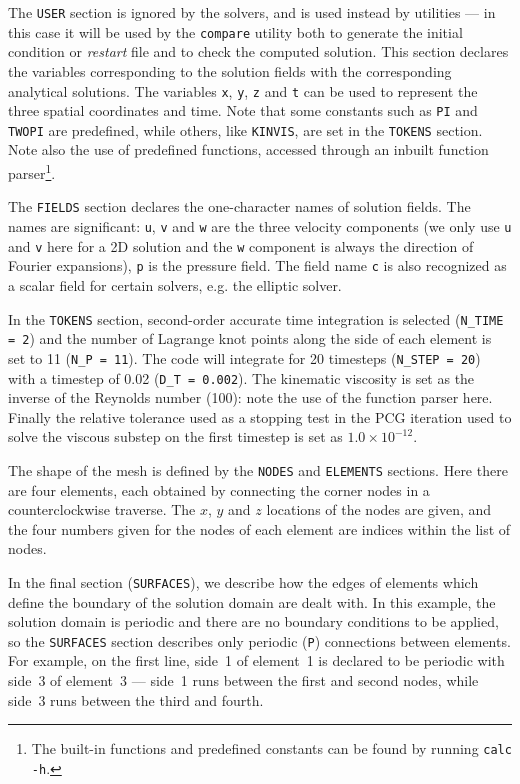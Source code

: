 \documentclass[11pt,a4paper]{report}
\begin{document}
The \texttt{USER} section is ignored by the solvers, and is used
instead by utilities --- in this case it will be used by the
\texttt{compare} utility both to generate the initial condition or
\emph{restart} file and to check the computed solution.  This
section declares the variables corresponding to the solution fields
with the corresponding analytical solutions.  The variables
\texttt{x}, \texttt{y}, \texttt{z} and \texttt{t} can be used to
represent the three spatial coordinates and time.  Note that some
constants such as \texttt{PI} and \texttt{TWOPI} are predefined, while
others, like \texttt{KINVIS}, are set in the \texttt{TOKENS} section.
Note also the use of predefined functions, accessed through an inbuilt
function parser\footnote{The built-in functions and predefined constants
can be found by running \texttt{calc -h}.}.

The \texttt{FIELDS} section declares the one-character names of
solution fields.  The names are significant: \texttt{u}, \texttt{v}
and \texttt{w} are the three velocity components (we only use
\texttt{u} and \texttt{v} here for a 2D solution and the \texttt{w}
component is always the direction of Fourier expansions), \texttt{p}
is the pressure field.  The field name \texttt{c} is also recognized
as a scalar field for certain solvers, e.g. the elliptic solver.

In the \texttt{TOKENS} section, second-order accurate time integration
is selected (\verb+N_TIME = 2+) and the number of Lagrange knot points
along the side of each element is set to 11 (\verb+N_P = 11+).  The
code will integrate for 20 timesteps (\verb+N_STEP = 20+) with a
timestep of 0.02 (\verb+D_T = 0.002+).  The kinematic viscosity is
set as the inverse of the Reynolds number (100): note the use of the
function parser here.  Finally the relative tolerance used as a
stopping test in the PCG iteration used to solve the viscous substep
on the first timestep is set as $1.0\times10^{-12}$.

The shape of the mesh is defined by the \texttt{NODES} and
\texttt{ELEMENTS} sections.  Here there are four elements, each
obtained by connecting the corner nodes in a counterclockwise
traverse.  The $x$, $y$ and $z$ locations of the nodes are given, and
the four numbers given for the nodes of each element are indices
within the list of nodes.

In the final section (\texttt{SURFACES}), we describe how the edges of
elements which define the boundary of the solution domain are dealt
with.  In this example, the solution domain is periodic and there are
no boundary conditions to be applied, so the \texttt{SURFACES} section
describes only periodic (\verb+P+) connections between elements.  For
example, on the first line, side~1 of element~1 is declared to be
periodic with side~3 of element~3 --- side~1 runs between the first
and second nodes, while side~3 runs between the third and fourth.
\end{document}
